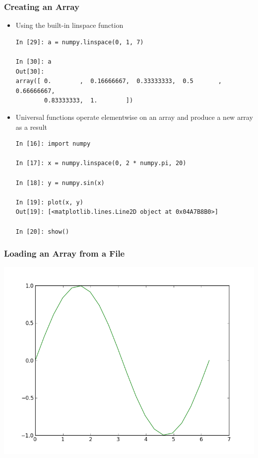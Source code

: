 \documentclass{beamer}
\begin{document}
\begin{frame}[fragile]
\frametitle{Creating an Array}
\begin{itemize}
  \item{Using the built-in linspace function}
  \begin{lstlisting}
In [29]: a = numpy.linspace(0, 1, 7)

In [30]: a
Out[30]:
array([ 0.        ,  0.16666667,  0.33333333,  0.5       ,  0.66666667,
        0.83333333,  1.        ])
  \end{lstlisting}

  \item{Universal functions operate elementwise on an array and produce a new array as a result}
  \begin{lstlisting}
In [16]: import numpy

In [17]: x = numpy.linspace(0, 2 * numpy.pi, 20)

In [18]: y = numpy.sin(x)

In [19]: plot(x, y)
Out[19]: [<matplotlib.lines.Line2D object at 0x04A7B8B0>]

In [20]: show()
  \end{lstlisting}

\end{itemize}
\end{frame}

\begin{frame}[fragile]
\frametitle{Loading an Array from a File}
  \centering
    \includegraphics[width=.7\textwidth]{figures/sinx.png} 
\end{frame}
\end{document}
